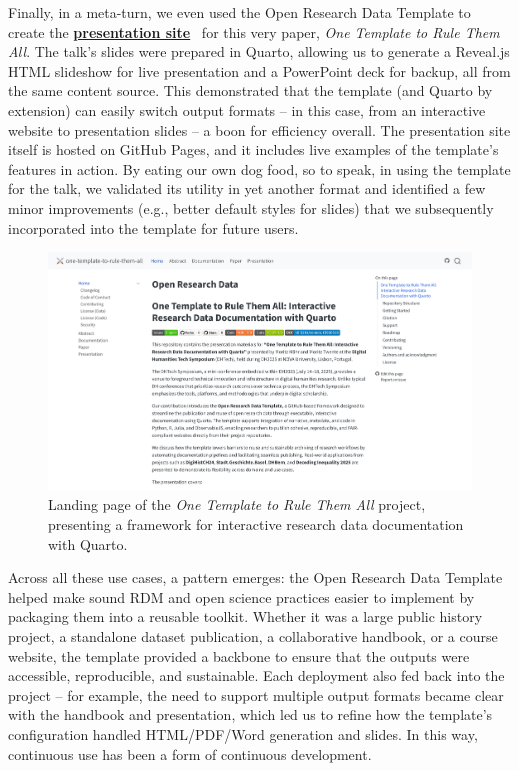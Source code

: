 \documentclass[final]{anthology-ch} %
\begin{document}
Finally, in a meta-turn, we even used the Open Research Data Template to create the \href{https://maehr.github.io/one-template-to-rule-them-all/}{\textbf{presentation site}}~\cite{mahr2025h} for this very paper, \emph{One Template to Rule Them All}. The talk's slides were prepared in Quarto, allowing us to generate a Reveal.js HTML slideshow for live presentation and a PowerPoint deck for backup, all from the same content source. This demonstrated that the template (and Quarto by extension) can easily switch output formats -- in this case, from an interactive website to presentation slides -- a boon for efficiency overall. The presentation site itself is hosted on GitHub Pages, and it includes live examples of the template's features in action. By eating our own dog food, so to speak, in using the template for the talk, we validated its utility in yet another format and identified a few minor improvements (e.g., better default styles for slides) that we subsequently incorporated into the template for future users.

\begin{figure}[t!]
  \centering
  \includegraphics[width=0.9\linewidth]{images/one_template_to_rule_them_all.png}
  \caption{Landing page of the \emph{One Template to Rule Them All} project, presenting a framework for interactive research data documentation with Quarto.}
  \label{fig-one-template}
\end{figure}

Across all these use cases, a pattern emerges: the Open Research Data Template helped make sound RDM and open science practices easier to implement by packaging them into a reusable toolkit. Whether it was a large public history project, a standalone dataset publication, a collaborative handbook, or a course website, the template provided a backbone to ensure that the outputs were accessible, reproducible, and sustainable. Each deployment also fed back into the project -- for example, the need to support multiple output formats became clear with the handbook and presentation, which led us to refine how the template's configuration handled HTML/PDF/Word generation and slides. In this way, continuous use has been a form of continuous development.
\end{document}
